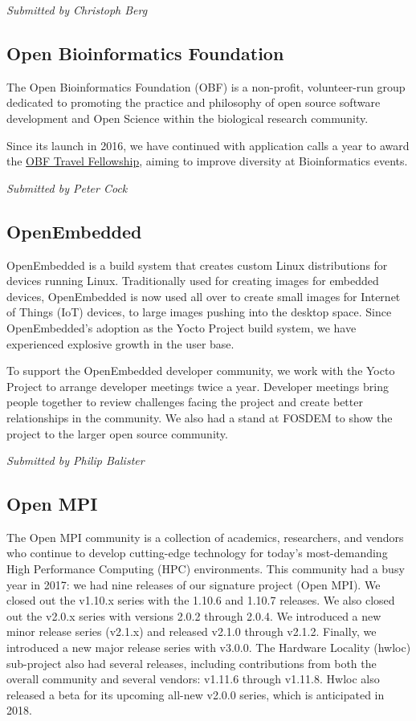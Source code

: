 \documentclass[a4paper]{report}
\begin{document}
{\em Submitted by Christoph Berg}

\subsection{Open Bioinformatics Foundation}

The Open Bioinformatics Foundation (OBF) is a non-profit, volunteer-run
group dedicated to promoting the practice and philosophy of open source
software development and Open Science within the biological research
community.

Since its launch in 2016, we have continued with application calls a
year to award the
\href{https://news.open-bio.org/2016/03/01/obf-travel-fellowship-program/}{OBF
Travel Fellowship}, aiming to improve diversity at Bioinformatics
events.

{\em Submitted by Peter Cock}

\subsection{OpenEmbedded}

OpenEmbedded is a build system that creates custom Linux distributions
for devices running Linux. Traditionally used for creating images for
embedded devices, OpenEmbedded is now used all over to create small
images for Internet of Things (IoT) devices, to large images pushing
into the desktop space.  Since OpenEmbedded's adoption as the Yocto
Project build system, we have experienced explosive growth in the user
base.

To support the OpenEmbedded developer community, we work with the Yocto
Project to arrange developer meetings twice a year. Developer meetings
bring people together to review challenges facing the project and create
better relationships in the community. We also had a stand at FOSDEM to
show the project to the larger open source community.

{\em Submitted by Philip Balister}

\subsection{Open MPI}

The Open MPI community is a collection of academics, researchers, and
vendors who continue to develop cutting-edge technology for today's
most-demanding High Performance Computing (HPC) environments.  This
community had a busy year in 2017: we had nine releases of our signature
project (Open MPI).  We closed out the v1.10.x series with the 1.10.6
and 1.10.7 releases.  We also closed out the v2.0.x series with versions
2.0.2 through 2.0.4.  We introduced a new minor release series (v2.1.x)
and released v2.1.0 through v2.1.2.  Finally, we introduced a new major
release series with v3.0.0.  The Hardware Locality (hwloc) sub-project
also had several releases, including contributions from both the overall
community and several vendors: v1.11.6 through v1.11.8.  Hwloc also
released a beta for its upcoming all-new v2.0.0 series, which is
anticipated in 2018.
\end{document}
